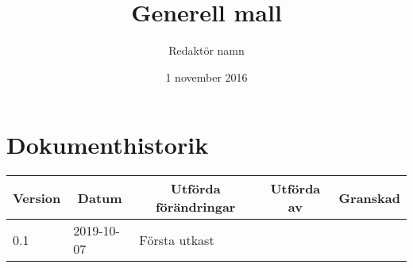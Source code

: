 \documentclass[10pt,oneside,swedish]{lips-no_customer}
\title{Generell mall}
\author{Redaktör namn}
\date{1 november 2016}
\begin{document}
\maketitle

\cleardoublepage
\makeprojectid

\cleardoublepage
\tableofcontents

\cleardoublepage
\section*{Dokumenthistorik}
\begin{tabular}{p{}|p{}|p{}|p{}|p{}} 
  \multicolumn{1}{c}{\bfseries Version} & 
  \multicolumn{1}{|c}{\bfseries Datum} & 
  \multicolumn{1}{|c}{\bfseries Utförda förändringar} & 
  \multicolumn{1}{|c}{\bfseries Utförda av} & 
  \multicolumn{1}{|c}{\bfseries Granskad}\\
  \hline
  \hline
  0.1 & 2019-10-07 & Första utkast & & \\
  \hline
\end{tabular}

\cleardoublepage
{}\cfoot{\thepage}





\end{document}
